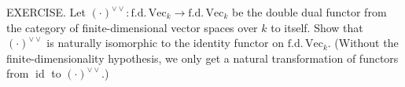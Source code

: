 EXERCISE. Let $(\cdot)^{\vee\vee} : \mathrm{f.d.}\,\mathrm{Vec}_k \to \mathrm{f.d.}\,\mathrm{Vec}_k$ be the double dual functor from the category of finite-dimensional vector spaces over $k$ to itself. Show that $(\cdot)^{\vee\vee}$ is naturally isomorphic to the identity functor on $\mathrm{f.d.}\,\mathrm{Vec}_k$. (Without the finite-dimensionality hypothesis, we only get a natural transformation of functors from $\operatorname{id}$ to $(\cdot)^{\vee\vee}$.)
